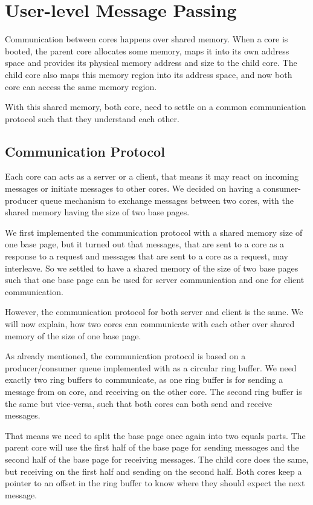 \section{User-level Message Passing}

Communication between cores happens over shared memory. When a core is booted, the parent core allocates some memory, maps it into its own address space and provides its physical memory address and size to the child core. The child core also maps this memory region into its address space, and now both core can access the same memory region.

With this shared memory, both core, need to settle on a common communication protocol such that they understand each other.

\subsection{Communication Protocol}

Each core can acts as a server or a client, that means it may react on incoming messages or initiate messages to other cores.
We decided on having a consumer-producer queue mechanism to exchange messages between two cores, with the shared memory having the size of two base pages. 

We first implemented the communication protocol with a shared memory size of one base page, but it turned out that messages, that are sent to a core as a response to a request and messages that are sent to a core as a request, may interleave. So we settled to have a shared memory of the size of two base pages such that one base page can be used for server communication and one for client communication. 

However, the communication protocol for both server and client is the same. We will now explain, how two cores can communicate with each other over shared memory of the size of one base page.

As already mentioned, the communication protocol is based on a producer/consumer queue implemented with as a circular ring buffer. We need exactly two ring buffers to communicate, as one ring buffer is for sending a message from on core, and receiving on the other core. The second ring buffer is the same but vice-versa, such that both cores can both send and receive messages. 

That means we need to split the base page once again into two equals parts. The parent core will use the first half of the base page for sending messages and the second half of the base page for receiving messages. The child core does the same, but receiving on the first half and sending on the second half. Both cores keep a pointer to an offset in the ring buffer to know where they should expect the next message.

